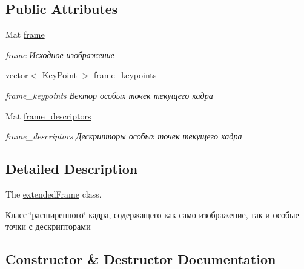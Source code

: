 \subsection*{Public Attributes}
\begin{DoxyCompactItemize}
\item 
\mbox{\label{classextended_frame_ae2e741f3d4423653ce0f02caae6cce39}} 
Mat \hyperlink{classextended_frame_ae2e741f3d4423653ce0f02caae6cce39}{frame}
\begin{DoxyCompactList}\small\item\em frame Исходное изображение \end{DoxyCompactList}\item 
\mbox{\label{classextended_frame_a2db09e4d1897e028982017f83270c355}} 
vector$<$ Key\+Point $>$ \hyperlink{classextended_frame_a2db09e4d1897e028982017f83270c355}{frame\+\_\+keypoints}
\begin{DoxyCompactList}\small\item\em frame\+\_\+keypoints Вектор особых точек текущего кадра \end{DoxyCompactList}\item 
\mbox{\label{classextended_frame_a01d160021a186399a58af49c0cd4c97f}} 
Mat \hyperlink{classextended_frame_a01d160021a186399a58af49c0cd4c97f}{frame\+\_\+descriptors}
\begin{DoxyCompactList}\small\item\em frame\+\_\+descriptors Дескрипторы особых точек текущего кадра \end{DoxyCompactList}\end{DoxyCompactItemize}


\subsection{Detailed Description}
The \hyperlink{classextended_frame}{extended\+Frame} class. 

Класс \char`\"{}расширенного\char`\"{} кадра, содержащего как само изображение, так и особые точки с дескрипторами 

\subsection{Constructor \& Destructor Documentation}
\mbox{\label{classextended_frame_a22ce1e80c5583831eb81ac280c544136}} 
